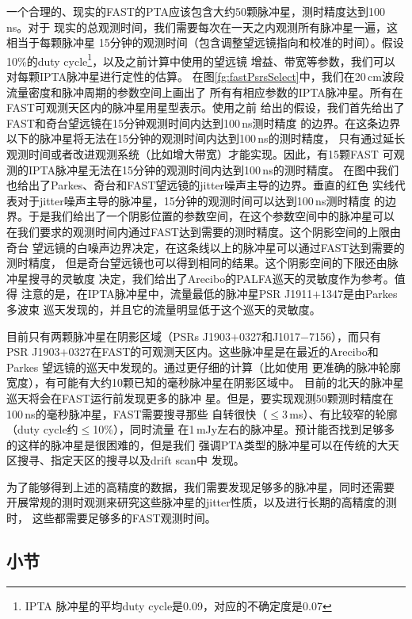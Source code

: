 一个合理的、现实的FAST的PTA应该包含大约50颗脉冲星，测时精度达到100\,ns。对于
现实的总观测时间，我们需要每次在一天之内观测所有脉冲星一遍，这相当于每颗脉冲星
15分钟的观测时间（包含调整望远镜指向和校准的时间）。假设10\%的duty cycle\footnote{IPTA
脉冲星的平均duty cycle是0.09，对应的不确定度是0.07}，以及之前计算中使用的望远镜
增益、带宽等参数，我们可以对每颗IPTA脉冲星进行定性的估算。
在图\ref{fg:fastPsrsSelect}中，我们在20\,cm波段流量密度和脉冲周期的参数空间上画出了
所有有相应参数的IPTA脉冲星。所有在FAST可观测天区内的脉冲星用星型表示。使用之前
给出的假设，我们首先给出了FAST和奇台望远镜在15分钟观测时间内达到100\,ns测时精度
的边界。在这条边界以下的脉冲星将无法在15分钟的观测时间内达到100\,ns的测时精度，
只有通过延长观测时间或者改进观测系统（比如增大带宽）才能实现。因此，有15颗FAST
可观测的IPTA脉冲星无法在15分钟的观测时间内达到100\,ns的测时精度。
在图中我们也给出了Parkes、奇台和FAST望远镜的jitter噪声主导的边界。垂直的红色
实线代表对于jitter噪声主导的脉冲星，15分钟的观测时间可以达到100\,ns测时精度
的边界。于是我们给出了一个阴影位置的参数空间，在这个参数空间中的脉冲星可以
在我们要求的观测时间内通过FAST达到需要的测时精度。这个阴影空间的上限由奇台
望远镜的白噪声边界决定，在这条线以上的脉冲星可以通过FAST达到需要的测时精度，
但是奇台望远镜也可以得到相同的结果。这个阴影空间的下限还由脉冲星搜寻的灵敏度
决定，我们给出了Arecibo的PALFA巡天的灵敏度作为参考\supercite{cfl+06}。值得
注意的是，在IPTA脉冲星中，流量最低的脉冲星PSR J1911$+$1347是由Parkes多波束
巡天发现的\supercite{fsk+04}，并且它的流量明显低于这个巡天的灵敏度。

目前只有两颗脉冲星在阴影区域（PSRs J1903$+$0327和J1017$-$7156），而只有
PSR J1903$+$0327在FAST的可观测天区内。这些脉冲星是在最近的Arecibo和Parkes
望远镜的巡天中发现的\supercite{crl+08,Keith12}。通过更仔细的计算（比如使用
更准确的脉冲轮廓宽度），有可能有大约10颗已知的毫秒脉冲星在阴影区域中。
目前的北天的脉冲星巡天\supercite{blr+13,ng13}将会在FAST运行前发现更多的脉冲
星。但是，要实现观测50颗测时精度在100\,ns的毫秒脉冲星，FAST需要搜寻那些
自转很快（$\le$3\,ms）、有比较窄的轮廓（duty cycle约$\le$10\%），同时流量
在1\,mJy左右的脉冲星。预计能否找到足够多的这样的脉冲星是很困难的，但是我们
强调PTA类型的脉冲星可以在传统的大天区搜寻、指定天区的搜寻以及drift scan中
发现。

为了能够得到上述的高精度的数据，我们需要发现足够多的脉冲星，同时还需要
开展常规的测时观测来研究这些脉冲星的jitter性质，以及进行长期的高精度的测时，
这些都需要足够多的FAST观测时间。

\subsection{小节}

